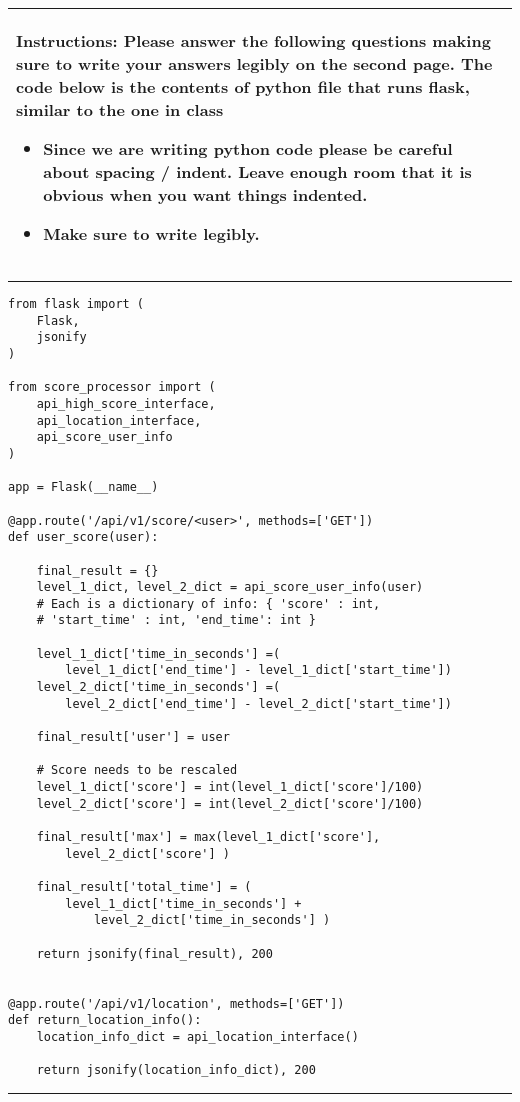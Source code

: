 \documentclass[11pt]{article}
\begin{document}
\begin{table}[h]
\centering
{} %
\begin{tabular}{|p{\textwidth}|}
\hline
\begin{minipage}[t]{\textwidth}
\vspace{0pt}  %
\noindent \textbf{Instructions:} Please answer the following questions making sure to write your answers legibly on the second page. The code below is the contents of python file that runs flask, similar to the one in class
\begin{itemize}
\item Since we are writing python code please be careful about spacing / indent. Leave enough room that it is obvious when you want things indented. 
\item Make sure to write legibly.

\end{itemize}
\end{minipage} 
\\
\hline
\end{tabular}
\end{table}

{\color{lightgray}\hrule}
\begin{verbatim}
from flask import (
    Flask,
    jsonify
)

from score_processor import (
    api_high_score_interface,
    api_location_interface,
    api_score_user_info
)

app = Flask(__name__)

@app.route('/api/v1/score/<user>', methods=['GET'])
def user_score(user):

    final_result = {}
    level_1_dict, level_2_dict = api_score_user_info(user)  
    # Each is a dictionary of info: { 'score' : int, 
    # 'start_time' : int, 'end_time': int }

    level_1_dict['time_in_seconds'] =(
        level_1_dict['end_time'] - level_1_dict['start_time'])
    level_2_dict['time_in_seconds'] =(
        level_2_dict['end_time'] - level_2_dict['start_time'])
    
    final_result['user'] = user

    # Score needs to be rescaled
    level_1_dict['score'] = int(level_1_dict['score']/100)
    level_2_dict['score'] = int(level_2_dict['score']/100)

    final_result['max'] = max(level_1_dict['score'],
        level_2_dict['score'] )
        
    final_result['total_time'] = (
        level_1_dict['time_in_seconds'] + 
            level_2_dict['time_in_seconds'] )

    return jsonify(final_result), 200


@app.route('/api/v1/location', methods=['GET'])
def return_location_info():
    location_info_dict = api_location_interface()

    return jsonify(location_info_dict), 200
\end{verbatim}
{\color{lightgray}\hrule}
\end{document}
